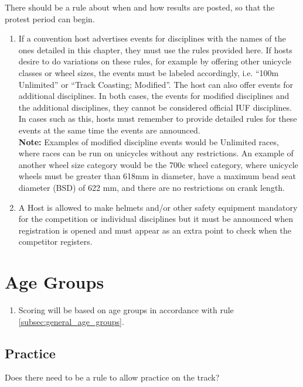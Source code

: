 \begin{comment2016}
There should be a rule about when and how results are posted, so that the protest period can begin.
\end{comment2016}

\begin{enumerate}[leftmargin=1.5em,labelsep=*]
	\item If a convention host advertises events for disciplines with the names of the ones detailed in this chapter, 
  they must use the rules provided here.
	If hosts desire to do variations on these rules, for example by offering other unicycle classes or wheel sizes, 
  the events must be labeled accordingly, i.e. ``100m Unlimited'' or ``Track Coasting; Modified''.
	The host can also offer events for additional disciplines.
	In both cases, the events for modified disciplines and the additional disciplines, they cannot be 
  considered official IUF disciplines.
	In cases such as this, hosts must remember to provide detailed rules for these events at the same time the 
  events are announced.\\
	\textbf{Note:} Examples of modified discipline events would be Unlimited races, where races can be run on 
  unicycles without any restrictions. An example of another wheel size category would be the 
  700c wheel category, where unicycle wheels must be greater than 618mm in diameter, 
  have a maximum bead seat diameter (BSD) of 622 mm, and there are no restrictions on crank length.
	
	\item A Host is allowed to make helmets and/or other safety equipment mandatory for 
  the competition or individual disciplines but it must be announced when registration is opened and 
  must appear as an extra point to check when the competitor registers.
\end{enumerate}

\section{Age Groups \label{subsec:track_racing-categories_age-groups}}

\begin{enumerate}[leftmargin=1.5em,labelsep=*]
	\item Scoring will be based on age groups in accordance with rule \ref{subsec:general_age_groups}.
\end{enumerate}

\begin{comment2016}
\section{Practice}

Does there need to be a rule to allow practice on the track?
\end{comment2016}

